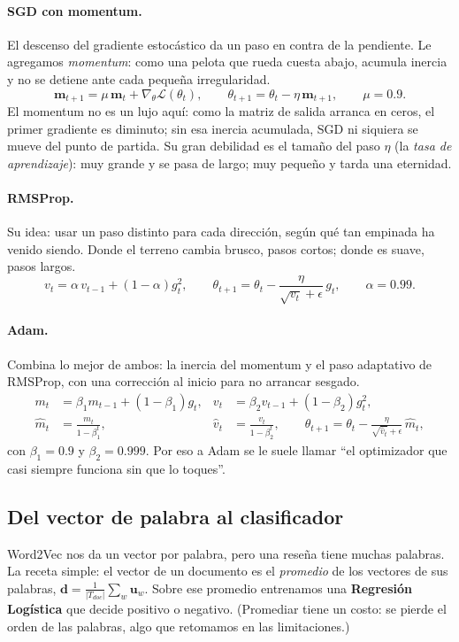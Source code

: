 \documentclass[11pt]{article}
\begin{document}
\paragraph{SGD con momentum.} El descenso del gradiente estocástico da un paso en contra de la
pendiente. Le agregamos \emph{momentum}: como una pelota que rueda cuesta abajo, acumula
inercia y no se detiene ante cada pequeña irregularidad.
\begin{equation}\label{eq:sgd}
\mathbf{m}_{t+1}=\mu\,\mathbf{m}_t+\nabla_\theta \mathcal{L}(\theta_t),\qquad
\theta_{t+1}=\theta_t-\eta\,\mathbf{m}_{t+1},\qquad \mu=0.9.
\end{equation}
El momentum no es un lujo aquí: como la matriz de salida arranca en ceros, el primer
gradiente es diminuto; sin esa inercia acumulada, SGD ni siquiera se mueve del punto de
partida. Su gran debilidad es el tamaño del paso $\eta$ (la \emph{tasa de aprendizaje}): muy
grande y se pasa de largo; muy pequeño y tarda una eternidad.

\paragraph{RMSProp.} Su idea: usar un paso distinto para cada dirección, según qué tan
empinada ha venido siendo. Donde el terreno cambia brusco, pasos cortos; donde es suave,
pasos largos.
\begin{equation}
v_t=\alpha\,v_{t-1}+(1-\alpha)g_t^2,\qquad
\theta_{t+1}=\theta_t-\frac{\eta}{\sqrt{v_t}+\epsilon}\,g_t,\qquad \alpha=0.99.
\end{equation}

\paragraph{Adam.} Combina lo mejor de ambos: la inercia del momentum y el paso adaptativo de
RMSProp, con una corrección al inicio para no arrancar sesgado.
\begin{align}
m_t&=\beta_1 m_{t-1}+(1-\beta_1)g_t, & v_t&=\beta_2 v_{t-1}+(1-\beta_2)g_t^2,\\
\hat{m}_t&=\tfrac{m_t}{1-\beta_1^t}, & \hat{v}_t&=\tfrac{v_t}{1-\beta_2^t},\qquad
\theta_{t+1}=\theta_t-\frac{\eta}{\sqrt{\hat{v}_t}+\epsilon}\,\hat{m}_t,
\end{align}
con $\beta_1=0.9$ y $\beta_2=0.999$. Por eso a Adam se le suele llamar ``el optimizador que
casi siempre funciona sin que lo toques''.

\subsection{Del vector de palabra al clasificador}
Word2Vec nos da un vector por palabra, pero una reseña tiene muchas palabras. La receta
simple: el vector de un documento es el \emph{promedio} de los vectores de sus palabras,
$\mathbf{d}=\frac{1}{|T_{doc}|}\sum_{w}\mathbf{u}_w$. Sobre ese promedio entrenamos una
\textbf{Regresión Logística} que decide positivo o negativo. (Promediar tiene un costo: se
pierde el orden de las palabras, algo que retomamos en las limitaciones.)
\end{document}
